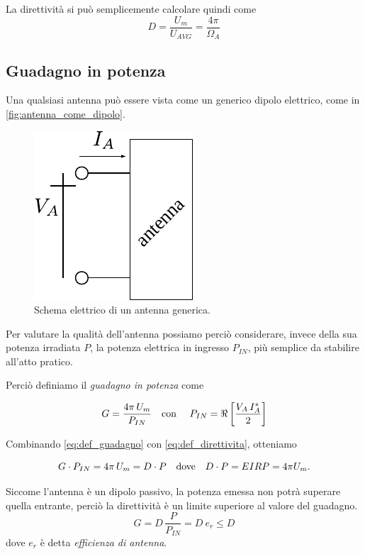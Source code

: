 La direttività si può semplicemente calcolare quindi come
\begin{equation} \label{eq:def_direttivita}
	D = \frac{U_m}{U_{AVG}} = \frac{4\pi}{\Omega_A}
\end{equation}

\subsection{Guadagno in potenza}
Una qualsiasi antenna può essere vista come un generico dipolo elettrico, come in \autoref{fig:antenna_come_dipolo}.

\begin{figure}[htp]
	\centering
	\includegraphics[]{img/antenna_come_dipolo.pdf}
	\caption{Schema elettrico di un antenna generica.}
	\label{fig:antenna_come_dipolo}
\end{figure}

Per valutare la qualità dell'antenna possiamo perciò considerare, invece della sua potenza irradiata $P$, la potenza elettrica in ingresso $P_{IN}$, più semplice da stabilire all'atto pratico.

Perciò definiamo il \emph{guadagno in potenza} come

\begin{equation} \label{eq:def_guadagno}
	G = \frac{4\pi \, U_m}{P_{IN}}
	\text{\quad con \quad} P_{IN} = \Re \left[ \frac{V_A \, I_A^*}{2} \right]
\end{equation}

Combinando \autoref{eq:def_guadagno} con \autoref{eq:def_direttivita}, otteniamo

\begin{equation*}
	G \cdot P_{IN} = 4\pi \, U_m = D \cdot P
	\text{\quad dove\quad} D \cdot P = EIRP = 4\pi U_m.
\end{equation*}

Siccome l'antenna è un dipolo passivo, la potenza emessa non potrà superare quella entrante, perciò la direttività è un limite superiore al valore del guadagno.
\begin{equation*}
	G = D \, \frac{P}{P_{IN}} = D ~ e_r \le D
\end{equation*}
dove $e_r$ è detta \emph{efficienza di antenna}.

